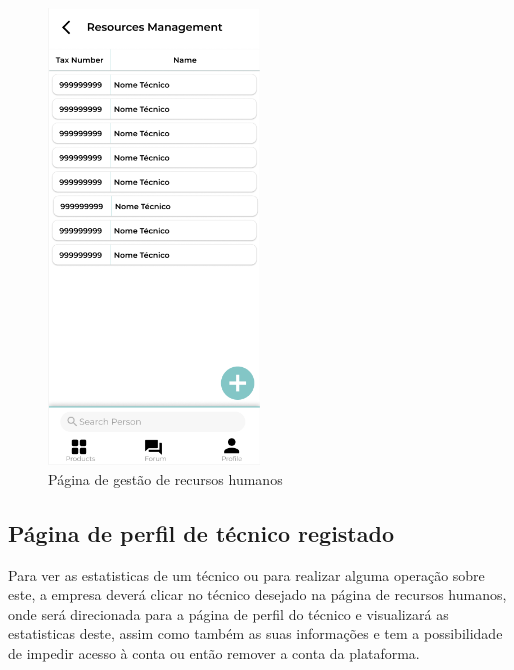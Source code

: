 \begin{figure}[htb]
    \centering
    \includegraphics[width=0.5\textwidth]{images/mockups/human_resources.png}
    \caption{Página de gestão de recursos humanos}
    \label{fig:31}
\end{figure}

\newpage

\subsection{Página de perfil de técnico registado}

Para ver as estatisticas de um técnico ou para realizar alguma operação sobre este, a empresa deverá
clicar no técnico desejado na página de recursos humanos, onde será direcionada para a página de perfil do
técnico e visualizará as estatisticas deste, assim como também as suas informações e tem a possibilidade
de impedir acesso à conta ou então remover a conta da plataforma.

